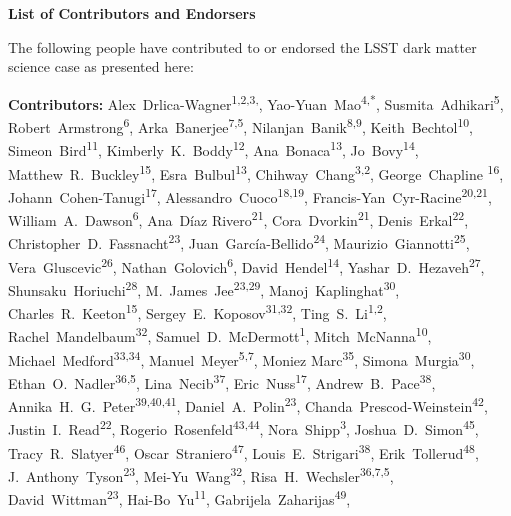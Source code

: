 
\begin{center}
  {\Large \bf List of Contributors and Endorsers}
\end{center}
\bigskip

The following people have contributed to or endorsed the LSST dark matter science case as presented here:

\def\altaffilmark#1{\textsuperscript{#1}}
\def\affil#1{\noindent #1 \\}

\normalsize
\begin{raggedright}
\textbf{Contributors:}
Alex~Drlica-Wagner\altaffilmark{1,2,3,\textdagger},
Yao-Yuan~Mao\altaffilmark{4,*},
Susmita~Adhikari\altaffilmark{5},
Robert~Armstrong\altaffilmark{6},
Arka~Banerjee\altaffilmark{7,5},
Nilanjan~Banik\altaffilmark{8,9},
Keith~Bechtol\altaffilmark{10},
Simeon~Bird\altaffilmark{11},
Kimberly~K.~Boddy\altaffilmark{12},
Ana~Bonaca\altaffilmark{13},
Jo~Bovy\altaffilmark{14},
Matthew~R.~Buckley\altaffilmark{15},
Esra~Bulbul\altaffilmark{13},
Chihway~Chang\altaffilmark{3,2},
George~Chapline \altaffilmark{16},
Johann~Cohen-Tanugi\altaffilmark{17},
Alessandro~Cuoco\altaffilmark{18,19},
Francis-Yan~Cyr-Racine\altaffilmark{20,21},
William~A.~Dawson\altaffilmark{6},
Ana~D\'{i}az Rivero\altaffilmark{21},
Cora~Dvorkin\altaffilmark{21},
Denis~Erkal\altaffilmark{22},
Christopher~D.~Fassnacht\altaffilmark{23},
Juan~Garc\'ia-Bellido\altaffilmark{24},
Maurizio~Giannotti\altaffilmark{25},
Vera~Gluscevic\altaffilmark{26},
Nathan~Golovich\altaffilmark{6},
David~Hendel\altaffilmark{14},
Yashar~D.~Hezaveh\altaffilmark{27},
Shunsaku~Horiuchi\altaffilmark{28},
M.~James~Jee\altaffilmark{23,29},
Manoj~Kaplinghat\altaffilmark{30},
Charles~R.~Keeton\altaffilmark{15},
Sergey~E.~Koposov\altaffilmark{31,32},
Ting~S.~Li\altaffilmark{1,2},
Rachel~Mandelbaum\altaffilmark{32},
Samuel~D.~McDermott\altaffilmark{1},
Mitch~McNanna\altaffilmark{10},
Michael~Medford\altaffilmark{33,34},
Manuel~Meyer\altaffilmark{5,7},
Moniez Marc\altaffilmark{35},
Simona~Murgia\altaffilmark{30},
Ethan~O.~Nadler\altaffilmark{36,5},
Lina~Necib\altaffilmark{37},
Eric~Nuss\altaffilmark{17},
Andrew~B.~Pace\altaffilmark{38},
Annika~H.~G.~Peter\altaffilmark{39,40,41},
Daniel~A.~Polin\altaffilmark{23},
Chanda~Prescod-Weinstein\altaffilmark{42},
Justin~I.~Read\altaffilmark{22},
Rogerio~Rosenfeld\altaffilmark{43,44},
Nora~Shipp\altaffilmark{3},
Joshua~D.~Simon\altaffilmark{45},
Tracy~R.~Slatyer\altaffilmark{46},
Oscar~Straniero\altaffilmark{47},
Louis~E.~Strigari\altaffilmark{38},
Erik~Tollerud\altaffilmark{48},
J.~Anthony~Tyson\altaffilmark{23},
Mei-Yu~Wang\altaffilmark{32},
Risa~H.~Wechsler\altaffilmark{36,7,5},
David~Wittman\altaffilmark{23},
Hai-Bo~Yu\altaffilmark{11},
Gabrijela~Zaharijas\altaffilmark{49},


\end{raggedright}
